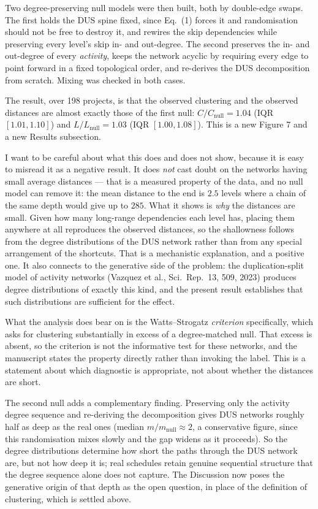 \documentclass[11pt,a4paper]{article}
\begin{document}
Two degree-preserving null models were then built, both by double-edge swaps.
The first holds the DUS spine fixed, since Eq.~(1) forces it and randomisation
should not be free to destroy it, and rewires the skip dependencies while
preserving every level's skip in- and out-degree. The second preserves the in-
and out-degree of every {\em activity}, keeps the network acyclic by requiring
every edge to point forward in a fixed topological order, and re-derives the DUS
decomposition from scratch. Mixing was checked in both cases.

The result, over 198 projects, is that the observed clustering and the observed
distances are almost exactly those of the first null: $C/C_{\mathrm{null}} =
1.04$ (IQR $[1.01, 1.10]$) and $L/L_{\mathrm{null}} = 1.03$ (IQR
$[1.00, 1.08]$). This is a new Figure 7 and a new Results subsection.

I want to be careful about what this does and does not show, because it is easy
to misread it as a negative result. It does {\em not} cast doubt on the
networks having small average distances --- that is a measured property of the
data, and no null model can remove it: the mean distance to the end is $2.5$
levels where a chain of the same depth would give up to $285$. What it shows is
{\em why} the distances are small. Given how many long-range dependencies each
level has, placing them anywhere at all reproduces the observed distances, so
the shallowness follows from the degree distributions of the DUS network rather
than from any special arrangement of the shortcuts. That is a mechanistic
explanation, and a positive one. It also connects to the generative side of the
problem: the duplication-split model of activity networks (Vazquez et al.,
Sci.\ Rep.\ 13, 509, 2023) produces degree distributions of exactly this kind,
and the present result establishes that such distributions are sufficient for
the effect.

What the analysis does bear on is the Watts--Strogatz {\em criterion}
specifically, which asks for clustering substantially in excess of a
degree-matched null. That excess is absent, so the criterion is not the
informative test for these networks, and the manuscript states the property
directly rather than invoking the label. This is a statement about which
diagnostic is appropriate, not about whether the distances are short.

The second null adds a complementary finding. Preserving only the activity
degree sequence and re-deriving the decomposition gives DUS networks roughly
half as deep as the real ones (median $m/m_{\mathrm{null}} \approx 2$, a
conservative figure, since this randomisation mixes slowly and the gap widens
as it proceeds). So the degree distributions determine how short the paths
through the DUS network are, but not how deep it is; real schedules retain
genuine sequential structure that the degree sequence alone does not capture.
The Discussion now poses the generative origin of that depth as the open
question, in place of the definition of clustering, which is settled above.
\end{document}
